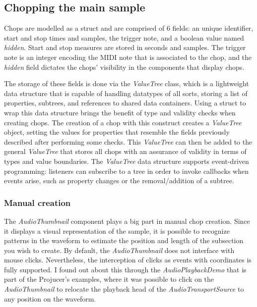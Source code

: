 \documentclass[12pt, a4paper, hidelinks]{article}
\begin{document}
	\subsection{Chopping the main sample}
	Chops are modelled as a struct and are comprised of 6 fields: an unique identifier, start and stop times and samples, the trigger note, and a boolean value named \textit{hidden}. Start and stop measures are stored in seconds and samples. The trigger note is an integer encoding the MIDI note that is associated to the chop, and the \textit{hidden} field dictates the chops' visibility in the components that display chops. \par 
	The storage of these fields is done via the \textit{ValueTree}\cite{valuetree} class, which is a lightweight data structure that is capable of handling datatypes of all sorts, storing a list of properties, subtrees, and references to shared data containers. Using a struct to wrap this data structure brings the benefit of type and validity checks when creating chops. The creation of a chop with this construct creates a \textit{ValueTree} object, setting the values for properties that resemble the fields previously described after performing some checks. This \textit{ValueTree} can then be added to the general \textit{ValueTree} that stores all chops with an assurance of validity in terms of types and value boundaries. The \textit{ValueTree} data structure supports event-driven programming: listeners can subscribe to a tree in order to invoke callbacks when events arise, such as property changes or the removal/addition of a subtree.
	
	
	\subsubsection{Manual creation}
	The \textit{AudioThumbnail} component plays a big part in manual chop creation. Since it displays a visual representation of the sample, it is possible to recognize patterns in the waveform to estimate the position and length of the subsection you wish to create. By default, the \textit{AudioThumbnail} does not interface with mouse clicks. Nevertheless, the interception of clicks as events with coordinates is fully supported. I found out about this through the \textit{AudioPlaybackDemo} that is part of the Projucer's examples, where it was possible to click on the \textit{AudioThumbnail} to relocate the playback head of the \textit{AudioTransportSource} to any position on the waveform.\par
	 
\end{document}
